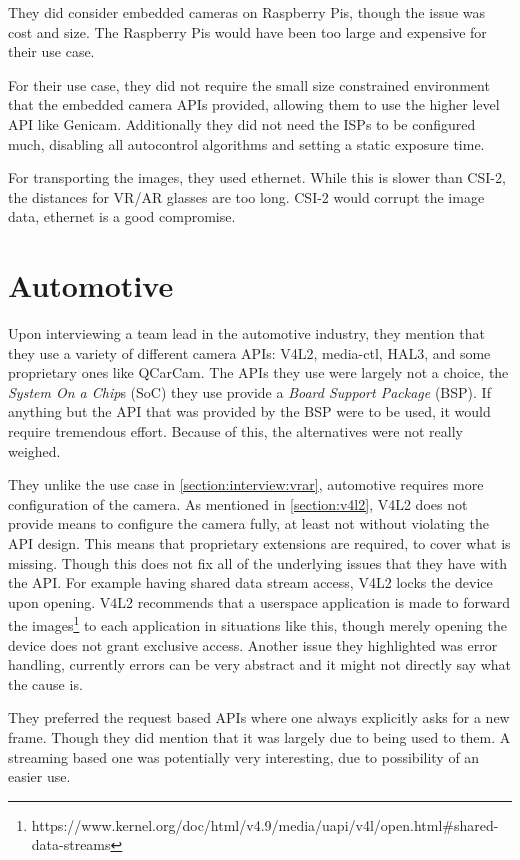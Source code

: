 They did consider embedded cameras on Raspberry Pis, though the issue was cost
and size. The Raspberry Pis would have been too large and expensive for their
use case.

For their use case, they did not require the small size constrained environment
that the embedded camera APIs provided, allowing them to use the higher level
API like Genicam. Additionally they did not need the ISPs to be configured
much, disabling all autocontrol algorithms and setting a static exposure time.

For transporting the images, they used ethernet. While this is slower than
CSI-2, the distances for VR/AR glasses are too long. CSI-2 would corrupt the
image data, ethernet is a good compromise.

\section{Automotive}
Upon interviewing a team lead in the automotive industry, they mention that
they use a variety of different camera APIs: V4L2, media-ctl, HAL3, and some
proprietary ones like QCarCam. The APIs they use were largely not a choice, the
\textit{System On a Chip}s (SoC) they use provide a \textit{Board Support Package} (BSP).
If anything but the API that was provided by the BSP were to be used, it would
require tremendous effort. Because of this, the alternatives were not really
weighed.

They unlike the use case in \cref{section:interview:vrar}, automotive requires
more configuration of the camera. As mentioned in \cref{section:v4l2}, V4L2
does not provide means to configure the camera fully, at least not without
violating the API design. This means that proprietary extensions are required,
to cover what is missing. Though this does not fix all of the underlying issues
that they have with the API. For example having shared data stream access, V4L2
locks the device upon opening. V4L2 recommends that a userspace application is
made to forward the images\footnote{https://www.kernel.org/doc/html/v4.9/media/uapi/v4l/open.html\#shared-data-streams}
to each application in situations like this, though merely opening the device
does not grant exclusive access. Another issue they highlighted was error handling,
currently errors can be very abstract and it might not directly say what the
cause is.

They preferred the request based APIs where one always explicitly asks for a
new frame. Though they did mention that it was largely due to being used to
them. A streaming based one was potentially very interesting, due to possibility
of an easier use.

